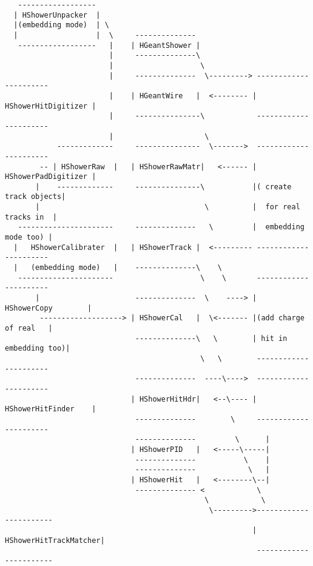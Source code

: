 \begin{lstlisting}
   ------------------
  | HShowerUnpacker  |                                                                   
  |(embedding mode)  | \                                                                 
  |                  |  \     --------------                                             
   ------------------   |    | HGeantShower |                                            
                        |     --------------\                                            
                        |                    \                                           
                        |     --------------  \---------> ----------------------          
                        |    | HGeantWire   |  <-------- |  HShowerHitDigitizer |         
                        |     ---------------\            ----------------------          
                        |                     \                                      
            -------------     ---------------  \------->  ----------------------         
        -- | HShowerRaw  |   | HShowerRawMatr|   <------ |  HShowerPadDigitizer |        
       |    -------------     ---------------\           |( create track objects|        
       |                                      \          |  for real tracks in  |        
   ----------------------     --------------   \         |  embedding mode too) |        
  |   HShowerCalibrater  |   | HShowerTrack |  <--------- ----------------------         
  |   (embedding mode)   |    --------------\    \                                        
   ----------------------                    \    \       ----------------------         
       |                      --------------  \    ----> |   HShowerCopy        |        
        -------------------> | HShowerCal   |  \<------- |(add charge of real   |        
                              --------------\   \        | hit in embedding too)|        
                                             \   \        ----------------------         
                              --------------  ----\---->  ----------------------         
                             | HShowerHitHdr|   <--\---- |  HShowerHitFinder    |        
                              --------------        \     ----------------------         
                              --------------         \      |                             
                             | HShowerPID   |   <-----\-----|                             
                              --------------           \    |                             
                              --------------            \   |                             
                             | HShowerHit   |   <--------\--|                             
                              -------------- <            \                               
                                              \            \                              
                                               \--------->-----------------------        
                                                         | HShowerHitTrackMatcher|       
                                                          -----------------------        


\end{lstlisting}
